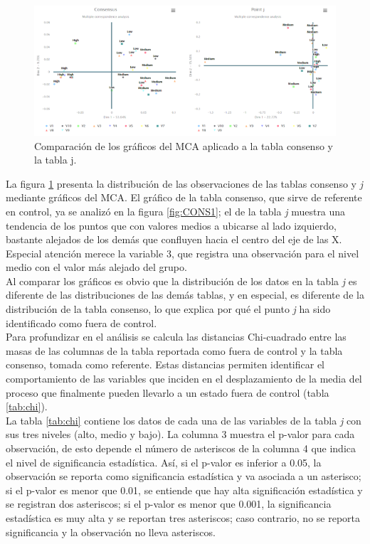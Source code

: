 \documentclass[water,article,submit,moreauthors,pdftex]{mdpi}
\begin{document}
\begin{figure}[!ht]



\begin{center}\includegraphics[width=0.6\linewidth,]{conspoint} \end{center}

\caption{Comparación de los gráficos del MCA aplicado a la tabla consenso y la tabla j.}

\label{fig:conspoint}
\end{figure}

La figura \ref{fig:conspoint} presenta la distribución de las
observaciones de las tablas consenso y \emph{j} mediante gráficos del
MCA. El gráfico de la tabla consenso, que sirve de referente en control,
ya se analizó en la figura \ref{fig:CONS1}; el de la tabla \emph{j}
muestra una tendencia de los puntos que con valores medios a ubicarse al
lado izquierdo, bastante alejados de los demás que confluyen hacia el
centro del eje de las X. Especial atención merece la variable 3, que
registra una observación para el nivel medio con el valor más alejado
del grupo.\\
Al comparar los gráficos es obvio que la distribución de los datos en la
tabla \emph{j} es diferente de las distribuciones de las demás tablas, y
en especial, es diferente de la distribución de la tabla consenso, lo
que explica por qué el punto \emph{j} ha sido identificado como fuera de
control.\\
Para profundizar en el análisis se calcula las distancias Chi-cuadrado
entre las masas de las columnas de la tabla reportada como fuera de
control y la tabla consenso, tomada como referente. Estas distancias
permiten identificar el comportamiento de las variables que inciden en
el desplazamiento de la media del proceso que finalmente pueden llevarlo
a un estado fuera de control (tabla \ref{tab:chi}).\\
La tabla \ref{tab:chi} contiene los datos de cada una de las variables
de la tabla \emph{j} con sus tres niveles (alto, medio y bajo). La
columna 3 muestra el p-valor para cada observación, de esto depende el
número de asteriscos de la columna 4 que indica el nivel de
significancia estadística. Así, si el p-valor es inferior a 0.05, la
observación se reporta como significancia estadística y va asociada a un
asterisco; si el p-valor es menor que 0.01, se entiende que hay alta
significación estadística y se registran dos asteriscos; si el p-valor
es menor que 0.001, la significancia estadística es muy alta y se
reportan tres asteriscos; caso contrario, no se reporta significancia y
la observación no lleva asteriscos.
\end{document}

